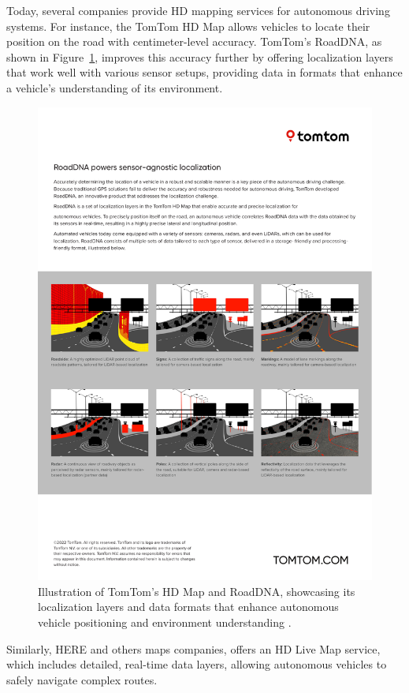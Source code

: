 Today, several companies provide HD mapping services for autonomous driving systems. For instance, the TomTom HD Map \cite{TomTomHDMaps} allows vehicles to locate their position on the road with centimeter-level accuracy. TomTom’s RoadDNA, as shown in Figure~\ref{fig:road_dna}, improves this accuracy further by offering localization layers that work well with various sensor setups, providing data in formats that enhance a vehicle’s understanding of its environment.
\begin{figure}
    \centering
    \includegraphics[width=0.9\linewidth]{LateX//figs/HD-Map-with-RoadDNA-Product-Sheet.pdf}
    \caption{Illustration of TomTom’s HD Map and RoadDNA, showcasing its localization layers and data formats that enhance autonomous vehicle positioning and environment understanding \cite{TomTomHDMaps}.}
    \label{fig:road_dna}
\end{figure}

Similarly, HERE and others maps companies, offers an HD Live Map service, which includes detailed, real-time data layers, allowing autonomous vehicles to safely navigate complex routes.

